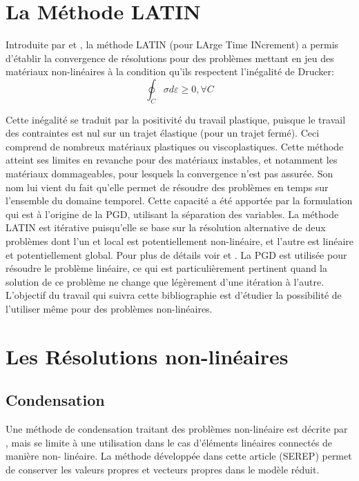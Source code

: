 \documentclass[12pt,a4paper]{report}
\begin{document}
\section{La Méthode LATIN}
Introduite par \cite{LATIN1} et \cite{LATIN2}, la méthode LATIN (pour LArge Time INcrement) a permis d'établir la
convergence de résolutions pour des problèmes mettant en jeu des matériaux non-linéaires
à la condition qu'ils respectent l'inégalité de Drucker:
\begin{equation}
\oint_C \sigma d\varepsilon \geq 0, \forall C
\end{equation}

Cette inégalité se traduit par la positivité du travail plastique, puisque le travail des contraintes est nul sur un trajet élastique (pour un trajet fermé). Ceci comprend de nombreux matériaux plastiques ou viscoplastiques. Cette méthode atteint ses limites en revanche pour des matériaux instables, et notamment les matériaux dommageables, pour lesquels la convergence n'est pas assurée. Son nom lui vient du fait qu'elle permet de résoudre des problèmes en temps sur l'ensemble du domaine temporel. Cette capacité a été apportée par la formulation qui est à l'origine de la PGD, utilisant la séparation des variables. La méthode LATIN est itérative puisqu'elle se base sur la résolution alternative de deux problèmes dont l'un et local est potentiellement non-linéaire, et l'autre est linéaire et potentiellement global. Pour plus de détails voir \cite{LATIN2} et \cite{LATINmultiscale}. La PGD est utilisée pour résoudre le problème linéaire, ce qui est particulièrement pertinent quand la solution de ce problème ne change que légèrement d'une itération à l'autre. L'objectif du travail qui suivra cette bibliographie est d'étudier la possibilité de l'utiliser même pour des problèmes non-linéaires.

\section{Les Résolutions non-linéaires}
\subsection{Condensation}
Une méthode de condensation traitant des problèmes non-linéaire est décrite par \cite{ERMT}, mais se limite à une utilisation dans le cas d'éléments linéaires connectés de manière non- linéaire. La méthode développée dans cette article (SEREP) permet de conserver les valeurs propres et vecteurs propres dans le modèle réduit.
\end{document}
